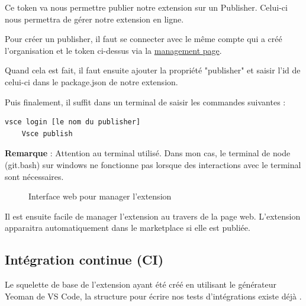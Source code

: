 \documentclass[
    iict, %
    il, %
]{heig-tb}
\begin{document}
Ce token va nous permettre publier notre extension sur un Publisher. Celui-ci nous permettra de gérer notre extension en ligne.

Pour créer un publisher, il faut se connecter avec le même compte qui a créé l'organisation et le token ci-dessus via la \href{https://marketplace.visualstudio.com/manage/publishers/}{management page}.

Quand cela est fait, il faut ensuite ajouter la propriété "publisher" et saisir l'id de celui-ci dans le package.json de notre extension.

Puis finalement, il suffit dans un terminal de saisir les commandes suivantes :
\begin{lstlisting}[frame=single]
    vsce login [le nom du publisher]
    Vsce publish
\end{lstlisting}

\textbf{Remarque} : Attention au terminal utilisé. Dans mon cas, le terminal de node (git.bash) sur windows ne fonctionne pas lorsque des interactions avec le terminal sont nécessaires.

\begin{figure}[!h]
    \begin{center}
    \end{center}
    \caption[Interface web pour manager l'extension]{\label{manage-publisher} Interface web pour manager l'extension}
\end{figure}

Il est ensuite facile de manager l'extension au travers de la page web.
L'extension apparaitra automatiquement dans le marketplace si elle est publiée.

\subsection{Intégration continue (CI)}

Le squelette de base de l'extension ayant été créé en utilisant le générateur Yeoman de VS Code, la structure pour écrire nos tests d'intégrations
existe déjà \cite{testing-extension}.
\end{document}
